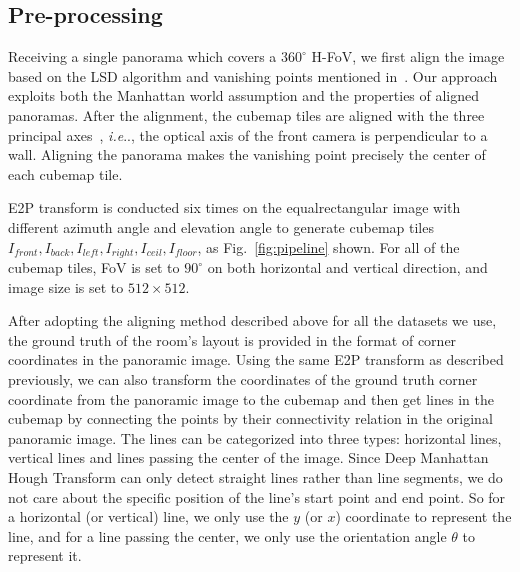 \documentclass[runningheads]{llncs}
\makeatletter
\DeclareRobustCommand\onedot{\futurelet\@let@token\@onedot}
\def\@onedot{\ifx\@let@token.\else.\null\fi\xspace}
\def\ie{\emph{i.e}\onedot} \def\Ie{\emph{I.e}\onedot}
\makeatother
\begin{document}
\subsection{Pre-processing}\label{sec:pre}
Receiving a single panorama which covers a $360^\circ$ H-FoV, we first align the image based on the LSD algorithm and vanishing points mentioned in~\cite{zou2018layoutnet,sun2019horizonnet}. Our approach exploits both the Manhattan world assumption and the properties of aligned panoramas. After the alignment, the cubemap tiles are aligned with the three principal axes~\cite{coughlan1999manhattan}, \ie, the optical axis of the front camera is perpendicular to a wall. Aligning the panorama makes the vanishing point precisely the center of each cubemap tile.



E2P transform is conducted six times on the equalrectangular image with different azimuth angle and elevation angle to generate cubemap tiles $I_{front}, I_{back}, I_{left}, I_{right}, I_{ceil}, I_{floor}$, as Fig.~\ref{fig:pipeline} shown. For 
all of the cubemap tiles, FoV is set to $90^\circ$ on both horizontal and vertical direction, and image size is set to $512\times 512$.


After adopting the aligning method described above for all the datasets we use, the ground truth of the room’s layout is provided in the format of corner coordinates in the panoramic image.
Using the same E2P transform as described previously, we can also transform the coordinates of the ground truth corner coordinate from the panoramic image to the cubemap and then get lines in the cubemap by connecting the points by their connectivity relation in the original panoramic image.
The lines can be categorized into three types: horizontal lines, vertical lines and lines passing the center of the image. 
Since Deep Manhattan Hough Transform can only detect straight lines rather than line segments, we do not care about the specific position of the line's start point and end point. So for a horizontal (or vertical) line, we only use the $y$ (or $x$) coordinate to represent the line, and for a line passing the center, we only use the orientation angle $\theta$ to represent it.
\end{document}
